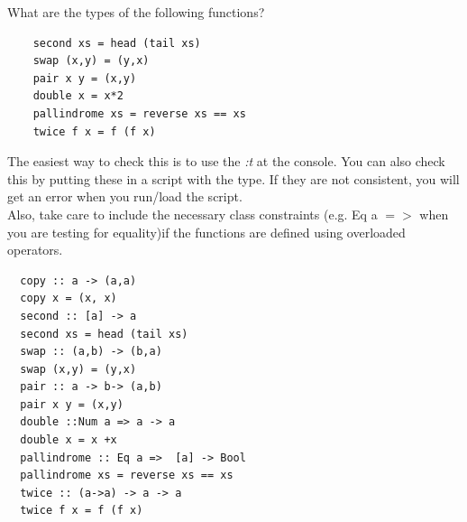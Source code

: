 \documentclass{article}
\begin{document}
\begin{Exercise}
What are the types of the following functions? \\
\begin{lstlisting}
    second xs = head (tail xs)
    swap (x,y) = (y,x)
    pair x y = (x,y)
    double x = x*2
    pallindrome xs = reverse xs == xs
    twice f x = f (f x)
\end{lstlisting}
The easiest way to check this is to use the \emph{:t} at the console. 
You can also check this by putting these in a script with the type. If they are not consistent, you will get an error when you run/load the script. \\
Also, take care to include the necessary class constraints (e.g. Eq a $=>$ when you are testing for equality)if the functions are defined using overloaded operators. 
\end{Exercise}
\begin{Answer}
\begin{lstlisting}
  copy :: a -> (a,a)
  copy x = (x, x)
  second :: [a] -> a
  second xs = head (tail xs)
  swap :: (a,b) -> (b,a)
  swap (x,y) = (y,x)
  pair :: a -> b-> (a,b)
  pair x y = (x,y)
  double ::Num a => a -> a
  double x = x +x
  pallindrome :: Eq a =>  [a] -> Bool
  pallindrome xs = reverse xs == xs
  twice :: (a->a) -> a -> a
  twice f x = f (f x)

\end{lstlisting}
\end{Answer}
\end{document}
